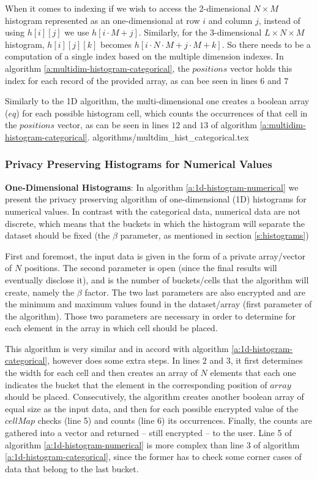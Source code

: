 When it comes to indexing if we wish to access the 2-dimensional $N \times M$ histogram represented as an one-dimensional at row $ i $ and column $ j $, instead of using $h[i][j]$ we use $h[i \cdot M + j]$.
Similarly, for the 3-dimensional $L \times N \times M$ histogram, $h[i][j][k]$ becomes $h[i \cdot N \cdot M + j \cdot M + k]$. So there needs to be a computation of a single index based on the multiple dimension indexes. In algorithm \ref{a:multidim-histogram-categorical}, the $positions$ vector holds this index for each record of the provided array, as can bee seen in lines $ 6 $ and $ 7 $

Similarly to the 1D algorithm, the multi-dimensional one creates a boolean array ($eq$) for each possible histogram cell, which counts the occurrences of that cell in the $positions$ vector, as can be seen in lines $12$ and $13$ of algorithm \ref{a:multidim-histogram-categorical}.
{algorithms/multdim_hist_categorical.tex}



\subsubsection{Privacy Preserving Histograms for Numerical Values}\label{sss:histogram-numerical}

\textbf{One-Dimensional Histograms}: In algorithm \ref{a:1d-histogram-numerical} we present the privacy preserving algorithm of one-dimensional (1D) histograms for numerical values.
In contrast with the categorical data, numerical data are not discrete, which means that the buckets in which the histogram will separate the dataset should be fixed (the $\beta$ parameter, as mentioned in section \ref{s:histograms})

First and foremost, the input data is given in the form of a private array/vector of $N$ positions.
The second parameter is open (since the final results will eventually disclose it), and is the number of buckets/cells that the algorithm will create, namely the $\beta$ factor.
The two last parameters are also encrypted and are the minimum and maximum values found in the dataset/array (first parameter of the algorithm).
Those two parameters are necessary in order to determine for each element in the array in which cell should be placed.

This algorithm is very similar and in accord with algorithm \ref{a:1d-histogram-categorical}, however does some extra steps.
In lines 2 and 3, it first determines the width for each cell and then creates an array of $N$ elements that each one indicates the bucket that the element in the corresponding position of $array$ should be placed.
Consecutively, the algorithm creates another boolean array of equal size as the input data, and then for each possible encrypted value of the $cellMap$ checks (line 5) and counts (line 6) its occurrences.
Finally, the counts are gathered into a vector and returned -- still encrypted -- to the user.
Line 5 of algorithm \ref{a:1d-histogram-numerical} is more complex than line 3 of algorithm \ref{a:1d-histogram-categorical}, since the former has to check some corner cases of data that belong to the last bucket.

